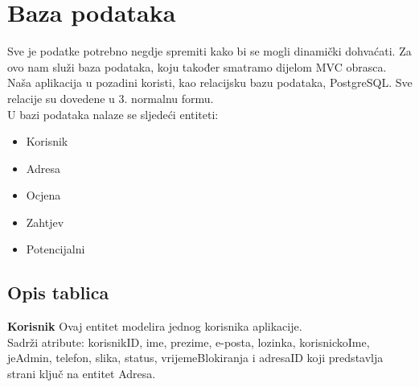 			
			
			\section{Baza podataka}
			
			Sve je podatke potrebno negdje spremiti kako bi se mogli dinamički dohvaćati. Za ovo nam služi baza podataka, koju također smatramo dijelom MVC obrasca. Naša aplikacija u pozadini koristi, kao relacijsku bazu podataka, PostgreSQL.
			Sve relacije su dovedene u 3. normalnu formu.\\
			U bazi podataka nalaze se sljedeći entiteti:
			\begin{itemize}
				\item Korisnik
				\item Adresa
				\item Ocjena
				\item Zahtjev
				\item Potencijalni
			\end{itemize}
			
			\subsection{Opis tablica}
			
			
			\textbf{Korisnik} Ovaj entitet modelira jednog korisnika aplikacije.\\
			Sadrži atribute: korisnikID, ime, prezime, e-posta, lozinka, korisnickoIme, jeAdmin, telefon, slika, status, vrijemeBlokiranja i
			adresaID koji predstavlja strani ključ na entitet Adresa.
			
